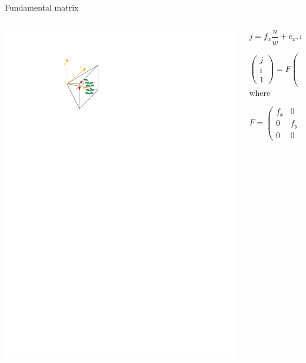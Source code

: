 \documentclass{beamer}
\begin{document}
\begin{frame}{Fundamental matrix}
    \begin{columns}
        \begin{column}{0.4\textwidth}
            \centering
            \includegraphics[width=\textwidth]{images/cam.pdf}
        \end{column}
        \begin{column}{0.6\textwidth}
            $$j = f_x \frac{u}{w} + c_x, i = f_y \frac{v}{w} + c_y$$

            $$\left( \begin{array}{c}
    j \\ i \\ 1
    \end{array} \right) = F \left( \begin{array}{c}
    u/w \\ v/w \\ 1
    \end{array} \right)$$ where

    $$F = \left( \begin{array}{ccc}
            f_x & 0 & c_x \\ 0 & f_y & c_y \\ 0 & 0 & 1
    \end{array} \right)$$
        \end{column}
    \end{columns}
\end{frame}
\end{document}
